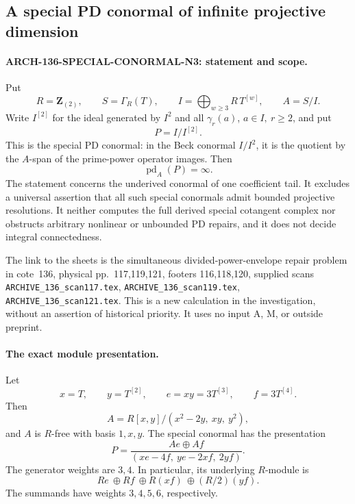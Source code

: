 \subsection{A special PD conormal of infinite projective dimension}
\label{arch136:special-conormal-n3}

\paragraph{ARCH-136-SPECIAL-CONORMAL-N3: statement and scope.}
Put
\[
 R=\mathbf Z_{(2)},\qquad S=\Gamma_R(T),\qquad
 I=\bigoplus_{w\geq3}R\,T^{[w]},\qquad A=S/I.
\]
Write \(I^{[2]}\) for the ideal generated by \(I^2\) and all
\(\gamma_r(a)\), \(a\in I,\ r\geq2\), and put
\[
                       P=I/I^{[2]}.
\]
This is the special PD conormal: in the Beck conormal \(I/I^2\),
it is the quotient by the \(A\)-span of the prime-power operator
images. Then
\[
                         \operatorname{pd}_A(P)=\infty.
                         \tag{136.SC1}
\]
The statement concerns the underived conormal of one coefficient
tail. It excludes a universal assertion that all such special
conormals admit bounded projective resolutions. It neither computes
the full derived special cotangent complex nor obstructs arbitrary
nonlinear or unbounded PD repairs, and it does not decide integral
connectedness.

The link to the sheets is the simultaneous divided-power-envelope
repair problem in cote~136, physical pp.~117,119,121, footers
116,118,120, supplied scans
\texttt{ARCHIVE\_136\_scan117.tex},
\texttt{ARCHIVE\_136\_scan119.tex},
\texttt{ARCHIVE\_136\_scan121.tex}. This is a new calculation in
the investigation, without an assertion of historical priority.
It uses no input A, M, or outside preprint.

\paragraph{The exact module presentation.}
Let
\[
 x=T,\qquad y=T^{[2]},\qquad
 e=xy=3T^{[3]},\qquad f=3T^{[4]}.
\]
Then
\[
 A=R[x,y]/(x^2-2y,\ xy,\ y^2),
 \tag{136.SC2}
\]
and \(A\) is \(R\)-free with basis \(1,x,y\). The special conormal
has the presentation
\[
 P=
 \frac{Ae\oplus Af}
 {(xe-4f,\ ye-2xf,\ 2yf)}.
 \tag{136.SC3}
\]
The generator weights are \(3,4\). In particular, its underlying
\(R\)-module is
\[
             R e\ \oplus R f\ \oplus R(xf)\
                         \oplus (R/2)(yf).
 \tag{136.SC4}
\]
The summands have weights \(3,4,5,6\), respectively.

